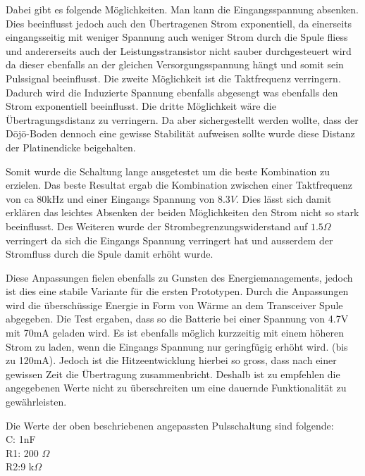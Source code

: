 Dabei gibt es folgende Möglichkeiten. Man kann die Eingangsspannung absenken. Dies beeinflusst jedoch auch den Übertragenen Strom exponentiell, da einerseits eingangsseitig mit weniger Spannung auch weniger Strom durch die Spule fliess und andererseits auch der Leistungsstransistor nicht sauber durchgesteuert wird da dieser ebenfalls an der gleichen Versorgungsspannung hängt und somit sein Pulssignal beeinflusst. Die zweite Möglichkeit ist die Taktfrequenz verringern. Dadurch wird die Induzierte Spannung ebenfalls abgesengt was ebenfalls den Strom exponentiell beeinflusst. Die dritte Möglichkeit wäre die Übertragungsdistanz zu verringern. Da aber sichergestellt werden wollte, dass der Dōjō-Boden dennoch eine gewisse Stabilität aufweisen sollte wurde diese Distanz der Platinendicke beigehalten.

Somit wurde die Schaltung lange ausgetestet um die beste Kombination zu erzielen. Das beste Resultat ergab die Kombination zwischen einer Taktfrequenz von ca 80kHz und einer Eingangs Spannung von $8.3V$. Dies lässt sich damit erklären das leichtes Absenken der beiden Möglichkeiten den Strom nicht so stark beeinflusst. Des Weiteren wurde der Strombegrenzungswiderstand auf $1.5\Omega$ verringert da sich die Eingangs Spannung verringert hat und ausserdem der Stromfluss durch die Spule damit erhöht wurde. 

Diese Anpassungen fielen ebenfalls zu Gunsten des Energiemanagements, jedoch ist dies eine stabile Variante für die ersten Prototypen. Durch die Anpassungen wird die überschüssige Energie in Form von Wärme an dem Transceiver Spule abgegeben. Die Test ergaben, dass so die Batterie bei einer Spannung von 4.7V mit 70mA geladen wird. Es ist ebenfalls möglich kurzzeitig mit einem höheren Strom zu laden, wenn die Eingangs Spannung nur geringfügig erhöht wird. (bis zu 120mA). Jedoch ist die Hitzeentwicklung hierbei so gross, dass nach einer gewissen Zeit die Übertragung zusammenbricht. Deshalb ist zu empfehlen die angegebenen Werte nicht zu überschreiten um eine dauernde Funktionalität zu gewährleisten.

Die Werte der oben beschriebenen angepassten Pulsschaltung sind folgende:\\
C: 1nF\\
R1: 200 $\Omega$\\
R2:9 k$\Omega$\\

